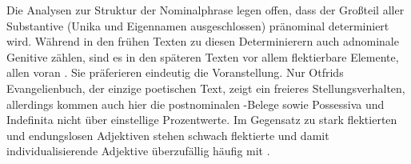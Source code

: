 Die Analysen zur Struktur der Nominalphrase legen offen, dass der Großteil aller Substantive (Unika und Eigennamen ausgeschlossen) pränominal determiniert wird. Während in den frühen Texten zu diesen Determinierern auch adnominale Genitive zählen, sind es in den späteren Texten vor allem flektierbare Elemente, allen voran . Sie präferieren eindeutig die Voranstellung. Nur Otfrids Evangelienbuch, der einzige poetischen Text, zeigt ein freieres Stellungsverhalten, allerdings kommen auch hier die postnominalen -Belege sowie Possessiva und Indefinita nicht über einstellige Prozentwerte. Im Gegensatz zu stark flektierten und endungslosen Adjektiven stehen schwach flektierte und damit individualisierende Adjektive überzufällig häufig mit .    



